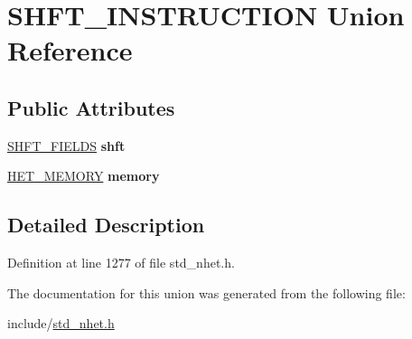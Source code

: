 \hypertarget{unionSHFT__INSTRUCTION}{}\section{S\+H\+F\+T\+\_\+\+I\+N\+S\+T\+R\+U\+C\+T\+I\+ON Union Reference}
\label{unionSHFT__INSTRUCTION}
\subsection*{Public Attributes}
\begin{DoxyCompactItemize}
\item 
\mbox{\label{unionSHFT__INSTRUCTION_a5a1ac4c076a066afeb192bfe0e7a7e97}} 
\mbox{\hyperlink{structshft__format}{S\+H\+F\+T\+\_\+\+F\+I\+E\+L\+DS}} {\bfseries shft}
\item 
\mbox{\label{unionSHFT__INSTRUCTION_a470e8934caaeb831f0a033c51830a1f2}} 
\mbox{\hyperlink{structmemory__format}{H\+E\+T\+\_\+\+M\+E\+M\+O\+RY}} {\bfseries memory}
\end{DoxyCompactItemize}


\subsection{Detailed Description}


Definition at line 1277 of file std\+\_\+nhet.\+h.



The documentation for this union was generated from the following file\+:\begin{DoxyCompactItemize}
\item 
include/\mbox{\hyperlink{std__nhet_8h}{std\+\_\+nhet.\+h}}\end{DoxyCompactItemize}
